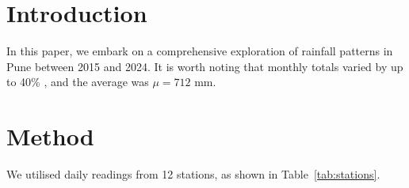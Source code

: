 \documentclass{article}
\begin{document}
\section{Introduction}
In this paper, we embark on a comprehensive exploration of rainfall patterns in
Pune between 2015 and 2024. It is worth noting that monthly totals varied by up
to 40\% \cite{rao2023}, and the average was $\mu = 712$ mm.

\section{Method}
We utilised daily readings from 12 stations, as shown in Table~\ref{tab:stations}.
\end{document}
